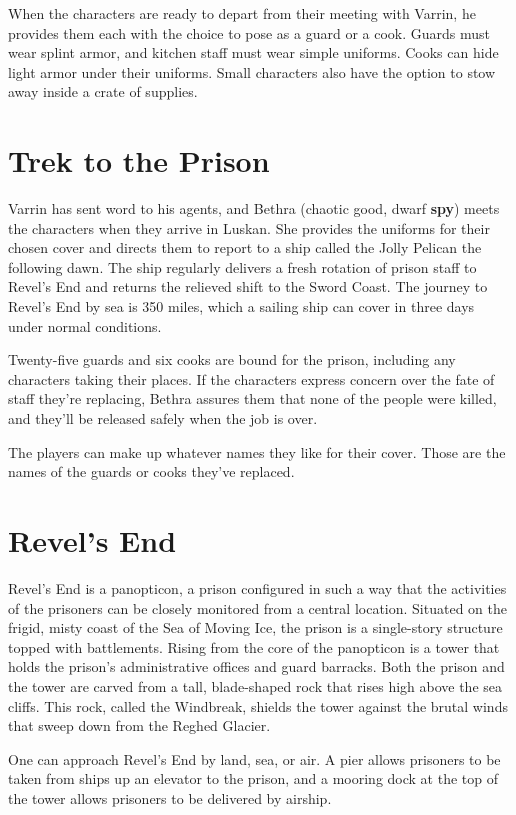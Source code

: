 \documentclass[10pt,a4paper,twoside,bg=print,twocolumn,openany,nodeprecatedcode]{dndbook}
\begin{document}
When the characters are ready to depart from their meeting with Varrin, he provides them each with the choice to pose as a guard or a cook. Guards must wear splint armor, and kitchen staff must wear simple uniforms. Cooks can hide light armor under their uniforms. Small characters also have the option to stow away inside a crate of supplies.

\section{Trek to the Prison}
Varrin has sent word to his agents, and Bethra (chaotic good, dwarf \textbf{spy}) meets the characters when they arrive in Luskan. She provides the uniforms for their chosen cover and directs them to report to a ship called the Jolly Pelican the following dawn. The ship regularly delivers a fresh rotation of prison staff to Revel's End and returns the relieved shift to the Sword Coast. The journey to Revel's End by sea is 350 miles, which a sailing ship can cover in three days under normal conditions.

Twenty-five guards and six cooks are bound for the prison, including any characters taking their places. If the characters express concern over the fate of staff they're replacing, Bethra assures them that none of the people were killed, and they'll be released safely when the job is over.

The players can make up whatever names they like for their cover. Those are the names of the guards or cooks they've replaced.

\section{Revel's End}
Revel's End is a panopticon, a prison configured in such a way that the activities of the prisoners can be closely monitored from a central location. Situated on the frigid, misty coast of the Sea of Moving Ice, the prison is a single-story structure topped with battlements. Rising from the core of the panopticon is a tower that holds the prison's administrative offices and guard barracks. Both the prison and the tower are carved from a tall, blade-shaped rock that rises high above the sea cliffs. This rock, called the Windbreak, shields the tower against the brutal winds that sweep down from the Reghed Glacier.

One can approach Revel's End by land, sea, or air. A pier allows prisoners to be taken from ships up an elevator to the prison, and a mooring dock at the top of the tower allows prisoners to be delivered by airship.
\end{document}
